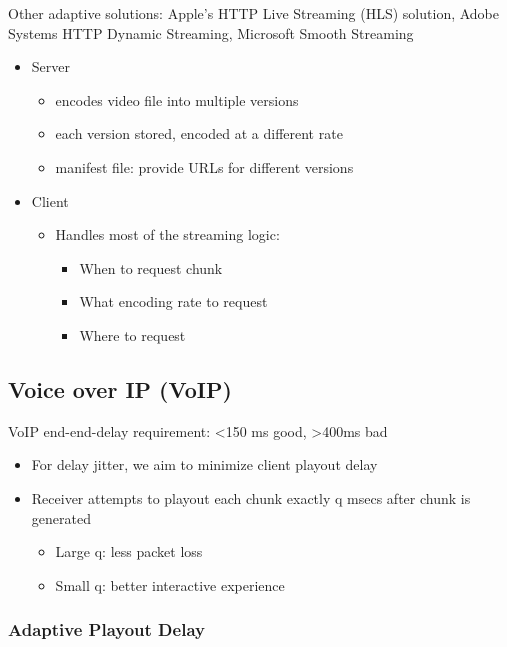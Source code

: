 \documentclass[a4paper]{article}
\begin{document}
\bigskip

\noindent Other adaptive solutions: Apple's HTTP Live Streaming (HLS) solution, Adobe Systems HTTP Dynamic Streaming, Microsoft Smooth Streaming
\begin{itemize}
    \item Server
    \begin{itemize}[label=$\circ$]
        \item encodes video file into multiple versions
        \item each version stored, encoded at a different rate
        \item manifest file: provide URLs for different versions
        \end{itemize}
    \item Client
    \begin{itemize}[label=$\circ$]
        \item Handles most of the streaming logic:
        \begin{itemize}[label=\tiny$\blacksquare$]
            \item When to request chunk
            \item What encoding rate to request
            \item Where to request
        \end{itemize}
    \end{itemize}
\end{itemize}

\subsection{Voice over IP (VoIP)}
VoIP end-end-delay requirement: <150 ms good, >400ms bad

\begin{itemize}
    \item For delay jitter, we aim to minimize client playout delay
    \item Receiver attempts to playout each chunk exactly q msecs after chunk is generated
    \begin{itemize}[label=$\circ$]
        \item Large q: less packet loss
        \item Small q: better interactive experience
    \end{itemize}
\end{itemize}

\subsubsection{Adaptive Playout Delay}
\end{document}
